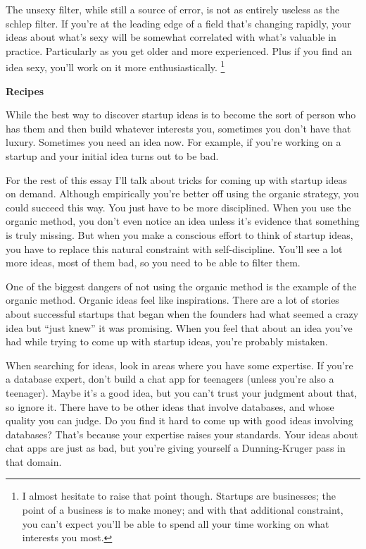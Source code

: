 \documentclass[12pt]{book}
\begin{document}
The unsexy filter, while still a source of error, is not as entirely
useless as the schlep filter. If you're at the leading edge of a field
that's changing rapidly, your ideas about what's sexy will be somewhat
correlated with what's valuable in practice. Particularly as you get
older and more experienced. Plus if you find an idea sexy, you'll work
on it more enthusiastically. \footnote{I almost hesitate to raise that point though. Startups are
businesses; the point of a business is to make money; and with that
additional constraint, you can't expect you'll be able to spend all your
time working on what interests you most.}

\textbf{Recipes}

While the best way to discover startup ideas is to become the sort of
person who has them and then build whatever interests you, sometimes you
don't have that luxury. Sometimes you need an idea now. For example, if
you're working on a startup and your initial idea turns out to be bad.

For the rest of this essay I'll talk about tricks for coming up with
startup ideas on demand. Although empirically you're better off using
the organic strategy, you could succeed this way. You just have to be
more disciplined. When you use the organic method, you don't even notice
an idea unless it's evidence that something is truly missing. But when
you make a conscious effort to think of startup ideas, you have to
replace this natural constraint with self-discipline. You'll see a lot
more ideas, most of them bad, so you need to be able to filter them.

One of the biggest dangers of not using the organic method is the
example of the organic method. Organic ideas feel like inspirations.
There are a lot of stories about successful startups that began when the
founders had what seemed a crazy idea but ``just knew'' it was
promising. When you feel that about an idea you've had while trying to
come up with startup ideas, you're probably mistaken.

When searching for ideas, look in areas where you have some expertise.
If you're a database expert, don't build a chat app for teenagers
(unless you're also a teenager). Maybe it's a good idea, but you can't
trust your judgment about that, so ignore it. There have to be other
ideas that involve databases, and whose quality you can judge. Do you
find it hard to come up with good ideas involving databases? That's
because your expertise raises your standards. Your ideas about chat apps
are just as bad, but you're giving yourself a Dunning-Kruger pass in
that domain.
\end{document}
